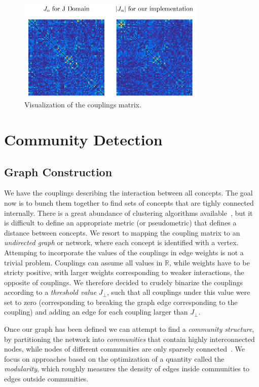 \documentclass[a4paper,12pt,twoside]{article}
\begin{document}
\begin{figure}
  \centerline{
    \includegraphics[width=0.8\textwidth]{../img/couplings_jdm.png}
  }
  \caption{Visualization of the couplings matrix.}
  \label{fig:jdmcouplings}
\end{figure}

\section{Community Detection}
\subsection{Graph Construction}
We have the couplings describing the interaction between all concepts. 
The goal now is to bunch them together to find sets of concepts that are tighly connected internally.
There is a great abundance of clustering algorithms available~\cite{jain1999}, but it is difficult to define an appropriate metric (or pseudometric) that defines a distance between concepts.
We resort to mapping the coupling matrix to an {\em undirected graph} or network, where each concept is identified with a vertex.
Attemping to incorporate the values of the couplings in edge weights is not a trivial problem.
Couplings can assume all values in $\mathbb R$, while weights have to be stricty positive, with larger weights corresponding to weaker interactions, the opposite of couplings.
We therefore decided to crudely binarize the couplings according to a {\em threshold value} $J_\bot$, such that all couplings under this value were set to zero (corresponding to breaking the graph edge corresponding to the coupling) and adding an edge for each coupling larger than $J_\bot$. 

Once our graph has been defined we can attempt to find a {\em community structure}, by partitioning the network into {\em communities} that contain highly interconnected nodes, while nodes of different communities are only sparsely connected~\cite{newman2004}.
We focus on approaches based on the optimization of a quantity called the {\em modularity}, which roughly measures the density of edges inside communities to edges outside communities.
\end{document}
